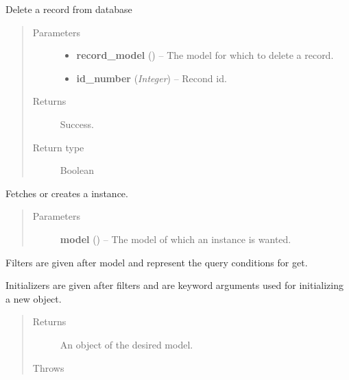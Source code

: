 \documentclass[letterpaper,10pt,english]{sphinxmanual}
\begin{document}
\begin{fulllineitems}
\label{controller:controller.common.delete_record}
Delete a record from database
\begin{quote}\begin{description}
\item[{Parameters}] \leavevmode\begin{itemize}
\item {} 
\textbf{record\_model} () -- The model for which to delete a record.

\item {} 
\textbf{id\_number} (\emph{Integer}) -- Recond id.

\end{itemize}

\item[{Returns}] \leavevmode
Success.

\item[{Return type}] \leavevmode
Boolean

\end{description}\end{quote}

\end{fulllineitems}


\begin{fulllineitems}
\label{controller:controller.common.get_or_create}
Fetches or creates a instance.
\begin{quote}\begin{description}
\item[{Parameters}] \leavevmode
\textbf{model} () -- The model of which an instance is wanted.

\end{description}\end{quote}

Filters are given after model and represent the query conditions for get.

Initializers are given after filters and are keyword arguments used for
initializing a new object.
\begin{quote}\begin{description}
\item[{Returns}] \leavevmode
An object of the desired model.

\item[{Throws }] \leavevmode
{}

\end{description}\end{quote}

\end{fulllineitems}
\end{document}
